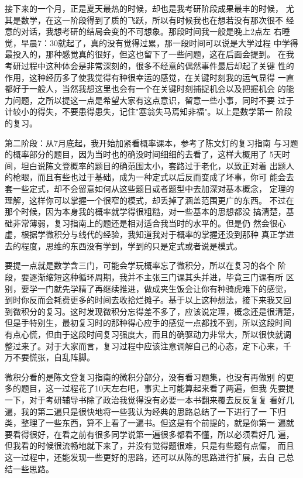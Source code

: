 \documentclass[11pt,twoside,openany,x11names,svgnames]{memoir}
\begin{document}
接下来的一个月，正是夏天最热的时候，却也是我考研阶段成果最丰的时候，
尤其是数学，在这一阶段得到了质的飞跃，所以有时候我也在想若没有那次很不
经意的对话，我想考研的结局会变的不可想象。那段时间我一般是晚上2点左
右睡觉，早晨7：30就起了，真的没有觉得过累，那一段时间可以说是大学过程
中学得最投入的，那种感觉真的很好，但这也留下了一些问题，这在后面会提到。
在我考研过程中这种体会是非常深刻的，很多不经意的偶然事件最后却起了关键
性的作用，这种经历多了使我觉得有种很幸运的感觉，在关键时刻我的运气显得
一直都好于一般人，当然我想这里也会有一个在关键时刻捕捉机会以及把握机会
的能力问题，之所以提这一点是希望大家有这点意识，留意一些小事，同时不要
过于计较小的得失，不要患得患失，记住"塞翁失马焉知非福"。以上是数学第一
阶段的复习。

第二阶段：从7月底起，我开始加紧看概率课本，参考了陈文灯的复习指南
与习题的概率部分的题目，因为当时也的确没时间细细的去看了，这样大概用了
5天时间，坦白说陈文登概率的题目的确范围太小，套路过于老化，以致正对着
出题人的枪眼，而且有些也过于基础，成为一种定式以后反而变成了坏事，你可
能会去套一些定式，却不会留意如何从这些题目或者题型中去加深对基本概念，
定理的理解，这样你可以掌握一个很窄的模式，却丢掉了涵盖范围更广的东西。
不过在那个时候，因为本身我的概率就学得很粗糙，对一些基本的思想都没
搞清楚，基础非常薄弱，复习指南上的题还是相对适合我当时的水平的。但是仍
然会很心虚，根据学微积分与线代的经验，我知道我对于概率的掌握还没到那种
真正学进去的程度，思维的东西没有学到，学到的只是定式或者说是模式。

要提一点就是数学含三门，可能会学玩概率忘了微积分，所以在复习的各个
阶段，要逐渐缩短这种循环周期，我并不主张三门课其头并进，毕竟三门课有所
区别，要学一门就先学精了再继续推进，做成夹生饭会让你有种骑虎难下的感觉，
到时你反而会耗费更多的时间去收拾烂摊子。基于以上这种想法，接下来我又回
到微积分的复习。这时发现微积分忘得差不多了，应该说定理，概念还是很清楚，
但是手特别生，最初复习时的那种得心应手的感觉一点都找不到，所以这段时间
有点心慌，但由于这段时间复习强度大，而且的确驱动力非常大，所以很快就调
整过来了。对于大家而言，复习过程中应该注意调解自己的心态，定下心来，千
万不要慌张，自乱阵脚。

微积分看的是陈文登复习指南的微积分部分，没有看习题集，也没有再做别
的更多的题目，这一过程花了10天左右吧，事实上可能算起来看了两遍，但我
先要提一下，对于考研辅导书除了政治我觉得没有必要一本书翻来覆去反反复复
看好几遍，我的第二遍只是很快地将一些我认为经典的思路总结了一下进行了一
下归类，整理了一些东西，算不上看了一遍书。但这是有个前提的，就是你第一
遍就要看得很好，在看之前有很多同学说第一遍很多都看不懂，所以必须看好几
遍，但我看的时候很流畅地就下来了，并没有觉得题很难，只是有些题有点偏，
而且这一过程中，还能发现一些更好的思路，还可以从陈的思路进行扩展，去自
己总结一些思路。
\end{document}
